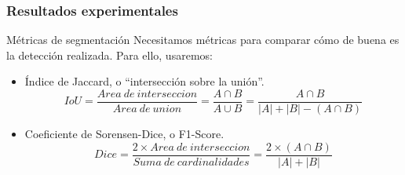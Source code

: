 \documentclass[11pt]{beamer}
\begin{document}
        \subsubsection{Resultados experimentales}
        \begin{frame}{Métricas de segmentación}
            Necesitamos métricas para comparar cómo de buena es la detección realizada. Para ello, usaremos:
            \begin{itemize}
                \item Índice de Jaccard, o ``intersección sobre la unión''.
                     \begin{equation}
                        IoU= \frac{Area\ de\ interseccion}{Area\ de\ union} = \frac{A \cap B}{A \cup B}=\frac{A\cap B}{|A|+|B|-(A \cap B)}
                    \end{equation}
                \item Coeficiente de Sorensen-Dice, o F1-Score.
                    \begin{equation}
                        Dice = \frac{2 \times Area\ de\ interseccion}{Suma\ de\ cardinalidades} = \frac{2 \times (A \cap B)}{|A| + |B|}
                    \end{equation}
            \end{itemize}
        \end{frame}
         
\end{document}
